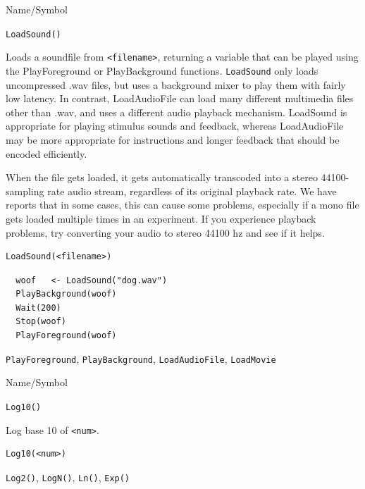 \begin{desc}{Name/Symbol}
\item[Name/Symbol]	\verb+LoadSound()+

\item[Description]	Loads a soundfile from \verb+<filename>+, 
returning a variable that can be played using the PlayForeground or PlayBackground functions.
\texttt{LoadSound} only loads uncompressed .wav files, but uses a background mixer to play them with fairly low latency.  
In contrast, LoadAudioFile can load many different multimedia files other than .wav, and uses a different audio playback mechanism.  LoadSound
is appropriate for playing stimulus sounds and feedback, whereas LoadAudioFile may be more appropriate for instructions and longer feedback that should be 
encoded efficiently.

When the file gets loaded, it gets automatically transcoded into a stereo 44100-sampling rate audio stream, regardless of its original
playback rate.  We have reports that in some cases, this can cause some problems, especially if a mono file
gets loaded multiple times in an experiment. If you experience playback problems, try converting your audio to 
stereo 44100 hz and see if it helps.

\item[Usage]
\begin{verbatim}
LoadSound(<filename>)
\end{verbatim}

\item[Example]	
\begin{verbatim}
  woof   <- LoadSound("dog.wav")
  PlayBackground(woof)
  Wait(200)
  Stop(woof)
  PlayForeground(woof)
\end{verbatim}

\item[See Also]	
\verb+PlayForeground+, \verb+PlayBackground+, \verb+LoadAudioFile+, \verb+LoadMovie+
\end{desc}


\begin{desc}{Name/Symbol}
\item[Name/Symbol]	\verb+Log10()+

\item[Description]	Log base 10 of \verb+<num>+.

\item[Usage]
\begin{verbatim}
Log10(<num>)
\end{verbatim}

\item[Example]	

\item[See Also]	\verb+Log2()+, \verb+LogN()+, \verb+Ln()+, \verb+Exp()+
\end{desc}


